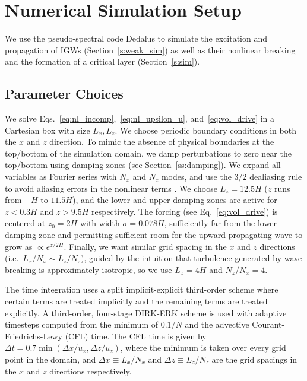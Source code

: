 \documentclass[
        fleqn,
        usenatbib,
    ]{mnras}
\begin{document}
\section{Numerical Simulation Setup}\label{s:numerics}

We use the pseudo-spectral code Dedalus \citep{dedalus,dedalus2} to simulate
the excitation and propagation of IGWs (Section~\ref{s:weak_sim}) as well as
their nonlinear breaking and the formation of a critical layer
(Section~\ref{s:sim}).

\subsection{Parameter Choices}\label{ss:params}

We solve Eqs.~\eqref{eq:nl_incomp},~\eqref{eq:nl_upsilon_u},
and~\eqref{eq:vol_drive} in a Cartesian box with size $L_x, L_z$. We choose
periodic boundary conditions in both the $x$ and $z$ direction. To mimic the
absence of physical boundaries at the top/bottom of the simulation domain, we
damp perturbations to zero near the top/bottom using damping zones (see
Section~\ref{ss:damping}). We expand all variables as Fourier series with $N_x$
and $N_z$ modes, and use the $3/2$ dealiasing rule to avoid aliasing errors in
the nonlinear terms \citep{boyd}. We choose $L_z = 12.5H$ ($z$ runs from $-H$ to
$11.5H$), and the lower and upper damping zones are active for $z < 0.3H$ and $z
> 9.5H$ respectively. The forcing (see Eq.~\eqref{eq:vol_drive}) is centered at
$z_0 = 2H$ with width $\sigma = 0.078H$, sufficiently far from the lower damping
zone and permitting sufficient room for the upward propagating wave to grow as
$\propto e^{z/2H}$. Finally, we want similar grid spacing in the $x$ and $z$
directions (i.e.\ $L_x / N_x \sim L_z /N_z$), guided by the intuition that
turbulence generated by wave breaking is approximately isotropic, so we use $L_x
= 4H$ and $N_z / N_x = 4$.

The time integration uses a split implicit-explicit third-order scheme where
certain terms are treated implicitly and the remaining terms are treated
explicitly. A third-order, four-stage DIRK-ERK scheme \citep{ascher} is used
with adaptive timesteps computed from \textcolor{Corr}{the minimum of $0.1 / N$
and the advective Courant-Friedrichs-Lewy (CFL) time. The CFL time is given by}
$\Delta t = 0.7 \min(\Delta x / u_x,\Delta z / u_{z})$, where the minimum is
taken over every grid point in the domain, and $\Delta x \equiv L_x / N_x$ and
$\Delta z \equiv L_z / N_z$ are the grid spacings in the $x$ and $z$ directions
respectively.
\end{document}
